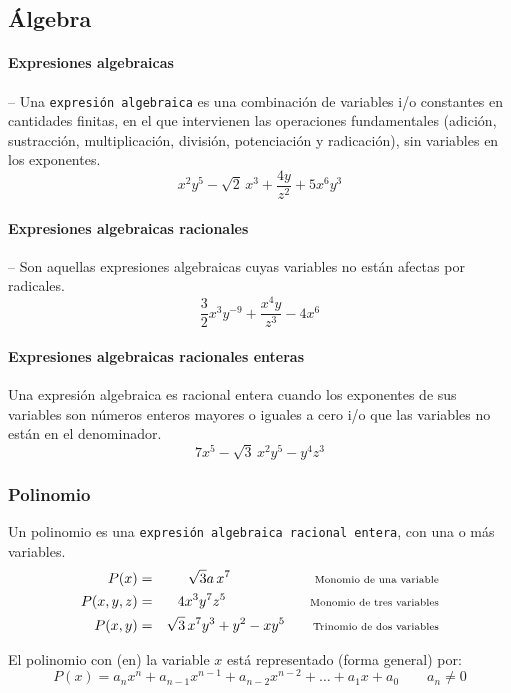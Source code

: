 \documentclass[11pt, twocolumn, landscape, a4paper]{article}
\begin{document}
\subsection*{Álgebra}
\paragraph*{Expresiones algebraicas} -- Una {\tt expresión algebraica} es una combinación de variables i/o constantes en cantidades finitas, en el que intervienen las operaciones fundamentales (adición, sustracción, multiplicación, división, potenciación y radicación), sin variables en los exponentes.
$$
x^{2}y^{5} - \sqrt{2}\,x^{3} + \dfrac{4y}{z^{2}} + 5x^{6}y^{3}
$$ 

\paragraph{Expresiones algebraicas racionales} -- Son aquellas expresiones algebraicas  cuyas variables no están afectas por radicales.
$$
\dfrac{3}{2}x^{3}y^{-9} + \dfrac{x^{4}y}{z^{3}} - 4x^{6}
$$
\paragraph{Expresiones algebraicas racionales enteras}
Una expresión algebraica es racional entera cuando los exponentes de sus variables son números enteros mayores o iguales a cero i/o que las variables no están en el denominador.
$$
7x^{5} - \sqrt{3}\,x^{2}y^{5} - y^{4}z^{3}
$$

\subsubsection*{Polinomio}
\noindent Un polinomio es una {\tt expresión algebraica racional entera}, con una o más variables.
\begin{eqnarray*}
P(x) &=& \sqrt{3}a\,x^{7}\qquad\qquad\qquad\text{\scriptsize Monomio de una variable} \\
P(x, y, z) &=& 4x^{3}y^{7}z^{5}\qquad\qquad\qquad\text{\scriptsize Monomio de tres variables} \\ 
P(x, y) &=& \sqrt{3}\,x^{7}y^{3} + y^{2} - xy^{5}\qquad\text{\scriptsize Trinomio de dos variables} 
\end{eqnarray*}

El polinomio con (en) la variable $x$ está representado (forma general) por:
$$
P(x) = a_{n}x^{n} + a_{n-1}x^{n-1} + a_{n-2}x^{n-2} + \ldots + a_{1}x + a_{0} \qquad a_{n} \neq 0
$$
\end{document}
